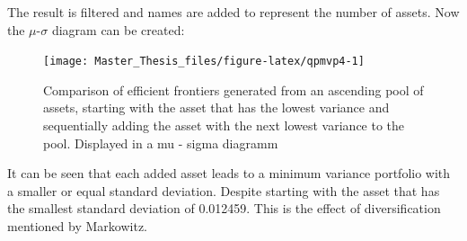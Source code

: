 \documentclass[
  oneside, a4paper, 12pt, openany]{book}
\newenvironment{Shaded}{\begin{snugshade}}{\end{snugshade}}
\newcommand{\AttributeTok}[1]{\textcolor[rgb]{0.77,0.63,0.00}{#1}}
\newcommand{\ConstantTok}[1]{\textcolor[rgb]{0.00,0.00,0.00}{#1}}
\newcommand{\ControlFlowTok}[1]{\textcolor[rgb]{0.13,0.29,0.53}{\textbf{#1}}}
\newcommand{\DecValTok}[1]{\textcolor[rgb]{0.00,0.00,0.81}{#1}}
\newcommand{\FloatTok}[1]{\textcolor[rgb]{0.00,0.00,0.81}{#1}}
\newcommand{\FunctionTok}[1]{\textcolor[rgb]{0.00,0.00,0.00}{#1}}
\newcommand{\NormalTok}[1]{#1}
\newcommand{\OtherTok}[1]{\textcolor[rgb]{0.56,0.35,0.01}{#1}}
\newcommand{\SpecialCharTok}[1]{\textcolor[rgb]{0.00,0.00,0.00}{#1}}
\newcommand{\StringTok}[1]{\textcolor[rgb]{0.31,0.60,0.02}{#1}}
\theoremstyle{definition}
\theoremstyle{definition}
\theoremstyle{definition}
\theoremstyle{definition}
\theoremstyle{remark}
\begin{document}
\begin{Shaded}
\end{Shaded}

\normalsize\vspace{0.1cm}

The result is filtered and names are added to represent the number of assets. Now the \(\mu\)-\(\sigma\) diagram can be created:

\begin{figure}[H]
\texttt{[image: Master\_Thesis\_files/figure-latex/qpmvp4-1]} \caption{Comparison of efficient frontiers generated from an ascending pool of assets, starting with the asset that has the lowest variance and sequentially adding the asset with the next lowest variance to the pool. Displayed in a mu - sigma diagramm}\label{fig:qpmvp4}
\end{figure}

It can be seen that each added asset leads to a minimum variance portfolio with a smaller or equal standard deviation. Despite starting with the asset that has the smallest standard deviation of 0.012459. This is the effect of diversification mentioned by Markowitz.
\end{document}
